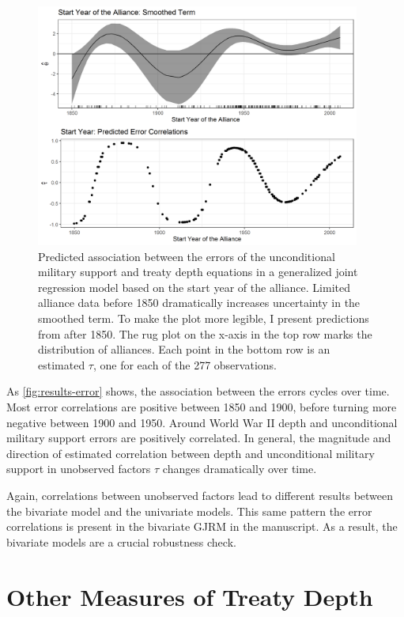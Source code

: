 \documentclass[12pt]{article}
\begin{document}
\begin{figure}[hbtp]
\centering
\includegraphics[width=0.95\textwidth]{results-error.png}
\caption{Predicted association between the errors of the unconditional military support and treaty depth equations in a generalized joint regression model based on the start year of the alliance. Limited alliance data before 1850 dramatically increases uncertainty in the smoothed term. To make the plot more legible, I present predictions from after 1850. The rug plot on the x-axis in the top row marks the distribution of alliances. Each point in the bottom row is an estimated $\tau$, one for each of the 277 observations.}
\label{fig:results-error}
\end{figure}


As \autoref{fig:results-error} shows, the association between the errors cycles over time. 
Most error correlations are positive between 1850 and 1900, before turning more negative between 1900 and 1950. 
Around World War II depth and unconditional military support errors are positively correlated. 
In general, the magnitude and direction of estimated correlation between depth and unconditional military support in unobserved factors $\tau$ changes dramatically over time.  


Again, correlations between unobserved factors lead to different results between the bivariate model and the univariate models. 
This same pattern the error correlations is present in the bivariate GJRM in the manuscript.
As a result, the bivariate models are a crucial robustness check. 



\section{Other Measures of Treaty Depth}
\end{document}
